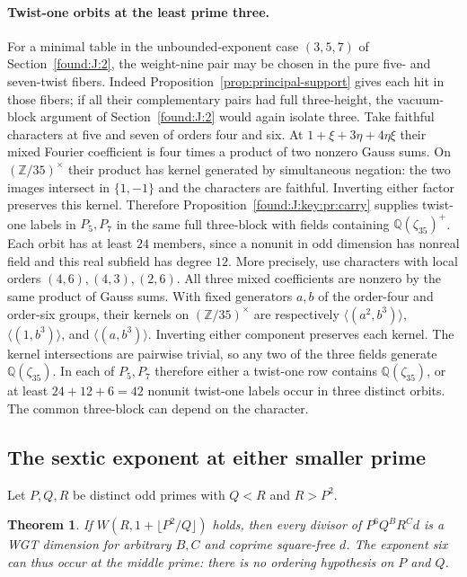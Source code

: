 \documentclass[11pt,a4paper]{article}
\numberwithin{equation}{section}
\newtheorem{theorem}{Theorem}[section]
\theoremstyle{remark}
\newcommand{\ZZ}{\mathbb Z}
\newcommand{\QQ}{\mathbb Q}
\begin{document}
\paragraph{Twist-one orbits at the least prime three.}
For a minimal table in the unbounded-exponent case $(3,5,7)$ of
Section~\ref{found:J:2}, the weight-nine pair may be chosen in the pure five-
and seven-twist fibers. Indeed Proposition~\ref{prop:principal-support} gives each hit
in those fibers; if all their complementary pairs had full
three-height, the vacuum-block argument of Section~\ref{found:J:2} would again
isolate three. Take faithful characters at five and seven of
orders four and six. At $1+\xi+3\eta+4\eta\xi$ their mixed
Fourier coefficient is four times a product of two nonzero Gauss
sums. On $(\ZZ/35)^\times$ their product has kernel generated by
simultaneous negation: the two images intersect in $\{1,-1\}$
and the characters are faithful. Inverting either factor preserves
this kernel. Therefore Proposition~\ref{found:J:key:pr:carry} supplies
twist-one labels in $P_5,P_7$ in the same full three-block with
fields containing $\QQ(\zeta_{35})^+$. Each orbit has at least
$24$ members, since a nonunit in odd dimension has nonreal field
and this real subfield has degree $12$.
More precisely, use characters with local orders $(4,6),(4,3),(2,6)$.
All three mixed coefficients are nonzero by the same product of
Gauss sums. With fixed generators $a,b$ of the order-four and
order-six groups, their kernels on $(\ZZ/35)^\times$ are respectively
$\langle(a^2,b^3)\rangle$, $\langle(1,b^3)\rangle$, and
$\langle(a,b^3)\rangle$. Inverting either component preserves each
kernel. The kernel intersections are pairwise trivial, so any two
of the three fields generate $\QQ(\zeta_{35})$. In each of $P_5,P_7$
therefore either a twist-one row contains $\QQ(\zeta_{35})$, or
at least $24+12+6=42$ nonunit twist-one labels occur in three
distinct orbits. The common three-block can depend on the character.

\subsection{The sextic exponent at either smaller prime}\label{found:J:3}
Let $P,Q,R$ be distinct odd primes with $Q<R$ and $R>P^2$. \begin{theorem}\label{found:J:3.1}\label{found:J:key:thm:middle}
If
$W(R,1+\lfloor P^2/Q\rfloor)$ holds, then every divisor of
$P^6 Q^B R^C d$ is a WGT dimension for arbitrary $B,C$ and coprime
square-free $d$. The exponent six can thus occur at the middle prime:
there is no ordering hypothesis on $P$ and $Q$.
\end{theorem}
\end{document}
